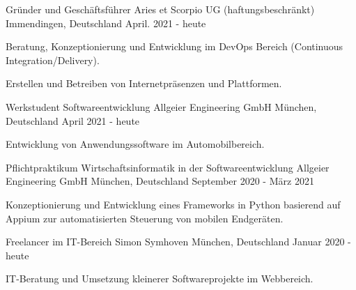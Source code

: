 

\begin{cventries}

  \cventry
    {Gründer und Geschäftsführer} %
    {Aries et Scorpio UG (haftungsbeschränkt)} %
    {Immendingen, Deutschland} %
    {April. 2021 - heute} %
    {
      \begin{cvitems} %
        \item {Beratung, Konzeptionierung und Entwicklung im DevOps Bereich (Continuous Integration/Delivery).}
        \item {Erstellen und Betreiben von Internetpräsenzen und Plattformen. }
      \end{cvitems}
    }
    
  \cventry
    {Werkstudent Softwareentwicklung} %
    {Allgeier Engineering GmbH} %
    {München, Deutschland} %
    {April 2021 - heute} %
    {
      \begin{cvitems} %
     	  \item {Entwicklung von Anwendungssoftware im Automobilbereich.}
      \end{cvitems}
    }
    
  \cventry
    {Pflichtpraktikum Wirtschaftsinformatik in der Softwareentwicklung} %
    {Allgeier Engineering GmbH} %
    {München, Deutschland} %
    {September 2020 - März 2021} %
    {
      \begin{cvitems} %
     	\item {Konzeptionierung und Entwicklung eines Frameworks in Python basierend auf Appium zur automatisierten Steuerung von mobilen Endgeräten.}
      \end{cvitems}
    }
    
  \cventry
    {Freelancer im IT-Bereich} %
    {Simon Symhoven} %
    {München, Deutschland} %
    {Januar 2020 - heute} %
    {
      \begin{cvitems} %
        \item {IT-Beratung und Umsetzung kleinerer Softwareprojekte im Webbereich.}
      \end{cvitems}
    }


\end{cventries}
